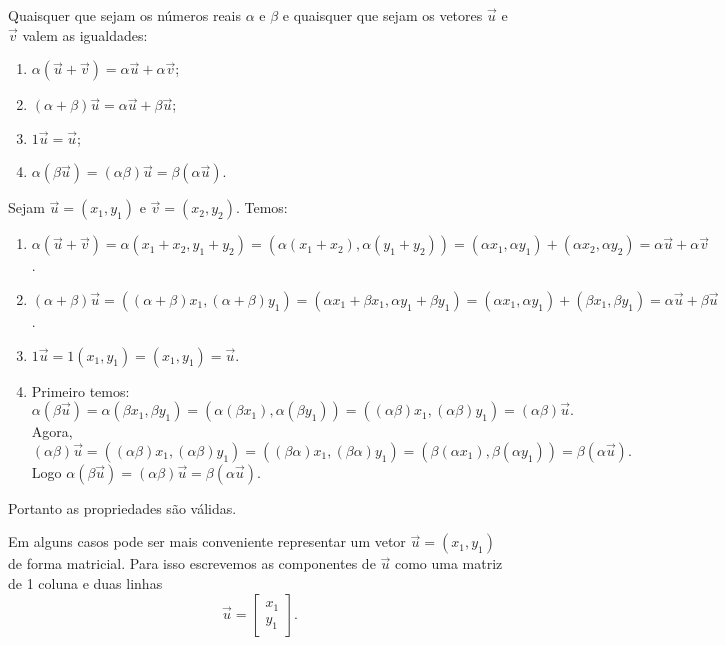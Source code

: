 \begin{propriedades}
    Quaisquer que sejam os números reais $\alpha$ e $\beta$ e quaisquer que sejam os vetores $\vec{u}$ e $\vec{v}$ valem as igualdades:
    \begin{enumerate}[label=({\roman*})]
        \item $\alpha(\vec{u} + \vec{v}) = \alpha\vec{u} + \alpha\vec{v}$;
        \item $(\alpha + \beta)\vec{u} = \alpha\vec{u} + \beta\vec{u}$;
        \item $1\vec{u} = \vec{u}$;
        \item $\alpha(\beta\vec{u}) = (\alpha\beta)\vec{u} = \beta(\alpha\vec{u})$.
    \end{enumerate}
\end{propriedades}
\begin{prova}
    Sejam $\vec{u} = (x_1,y_1)$ e $\vec{v} = (x_2,y_2)$. Temos:
    \begin{enumerate}[label=({\roman*})]
        \item $\alpha(\vec{u} + \vec{v}) = \alpha(x_1+x_2,y_1+y_2) = (\alpha(x_1+x_2),\alpha(y_1+y_2)) = (\alpha x_1,\alpha y_1) + (\alpha x_2,\alpha y_2) =  \alpha\vec{u} + \alpha\vec{v}$.
        \item $(\alpha + \beta)\vec{u} = ((\alpha+\beta)x_1,(\alpha+\beta)y_1) = (\alpha x_1 + \beta x_1, \alpha y_1 + \beta y_1) = (\alpha x_1,\alpha y_1) + (\beta x_1,\beta y_1) = \alpha\vec{u} + \beta\vec{u}$.
        \item $1\vec{u} = 1(x_1,y_1) = (x_1,y_1) = \vec{u}$.
        \item Primeiro temos:
              \[
                  \alpha(\beta\vec{u}) = \alpha(\beta x_1,\beta y_1) = (\alpha(\beta x_1),\alpha(\beta y_1)) = ((\alpha\beta)x_1,(\alpha\beta)y_1) = (\alpha\beta)\vec{u}.
              \]
              Agora,
              \[
                  (\alpha\beta)\vec{u} =     ((\alpha\beta)x_1,(\alpha\beta)y_1) = ((\beta\alpha)x_1,(\beta\alpha)y_1) = (\beta(\alpha x_1),\beta(\alpha y_1)) = \beta(\alpha\vec{u}).
              \]
              Logo $\alpha(\beta\vec{u}) = (\alpha\beta)\vec{u} = \beta(\alpha\vec{u})$.
    \end{enumerate}
    Portanto as propriedades são válidas.
\end{prova}

Em alguns casos pode ser mais conveniente representar um vetor $\vec{u} = (x_1, y_1)$ de forma matricial. Para isso escrevemos as componentes de $\vec{u}$ como uma matriz de 1 coluna e duas linhas
\[
    \vec{u} = \begin{bmatrix}
        x_1 \\y_1
    \end{bmatrix}.
\]

